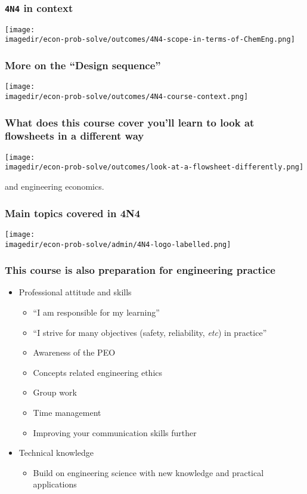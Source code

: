 \begin{frame}\frametitle{\texttt{4N4} in context}
	\begin{center}
		\texttt{[image: \\imagedir/econ-prob-solve/outcomes/4N4-scope-in-terms-of-ChemEng.png]}
	\end{center}
\end{frame}

\begin{frame}\frametitle{More on the ``Design sequence''}
	\begin{center}
		\texttt{[image: \\imagedir/econ-prob-solve/outcomes/4N4-course-context.png]}
	\end{center}
\end{frame}

\begin{frame}\frametitle{What does this course cover {\scriptsize you'll learn to look at flowsheets in a different way}}
	\begin{center}
		\texttt{[image: \\imagedir/econ-prob-solve/outcomes/look-at-a-flowsheet-differently.png]}
	\end{center}
	and engineering economics.
\end{frame}

\begin{frame}\frametitle{Main topics covered in 4N4}
	\begin{center}
		\texttt{[image: \\imagedir/econ-prob-solve/admin/4N4-logo-labelled.png]}
	\end{center}
	\vspace{-12pt}
	{\small {\color{brown}{This is a unique course: not taught anywhere else in Canada.}}}
\end{frame}

\begin{frame}\frametitle{This course is also preparation for engineering practice}
	\begin{itemize}
		\item	Professional attitude and skills
		\begin{itemize}
			\item	``I am responsible for my learning''
			\item	``I strive for many objectives (safety, reliability, \emph{etc}) in practice''
			\item	Awareness of the PEO
			\item	Concepts related engineering ethics
			\item	Group work 
			\item	Time management
			\item	Improving your communication skills further
		\end{itemize}
		\item	Technical knowledge
		\begin{itemize}
			\item	Build on {\color{purple} engineering science} with new knowledge and practical applications
		\end{itemize}
	\end{itemize}
\end{frame}

